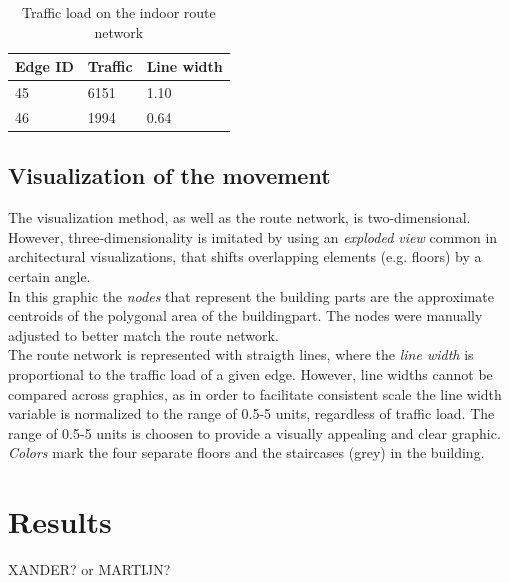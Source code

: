 \begin{table}[H]
\centering
\caption{Traffic load on the indoor route network}
\label{table:traffic}
\begin{tabular}{@{}lll@{}}
\toprule
Edge ID & Traffic & Line width \\ \midrule
45      & 6151    & 1.10       \\
46      & 1994    & 0.64       \\ \bottomrule
\end{tabular}
\end{table}


\subsection{Visualization of the movement}
The visualization method, as well as the route network, is two-dimensional.
However, three-dimensionality is imitated by using an \textit{exploded view}
common in architectural visualizations, that shifts overlapping elements (e.g.
floors) by a certain angle.\\
In this graphic the \textit{nodes} that represent the building parts are the approximate centroids of the polygonal area of the buildingpart. The nodes were manually adjusted
to better match the route network.\\
The route network is represented with
straigth lines, where the \textit{line width} is proportional to the traffic
load of a given edge. However, line widths cannot be compared across graphics, as in order
to facilitate consistent scale the line width variable is normalized to
the range of 0.5-5 units, regardless of traffic load. The range of 0.5-5 units
is choosen to provide a visually appealing and clear graphic. \textit{Colors}
mark the four separate floors and the staircases (grey) in the building.

\section{Results}

XANDER? or MARTIJN?
